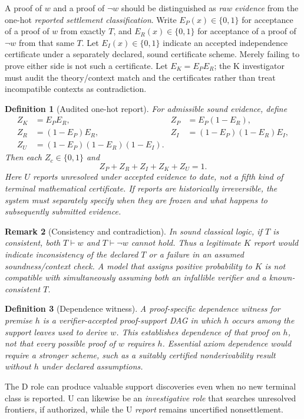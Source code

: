 \documentclass[11pt]{article}
\newtheorem{definition}{Definition}[section]
\newtheorem{remark}[definition]{Remark}
\begin{document}
A proof of $w$ and a proof of $\neg w$ should be distinguished as \emph{raw evidence} from the one-hot \emph{reported settlement classification}. Write $E_P(x)\in\{0,1\}$ for acceptance of a proof of $w$ from exactly $T$, and $E_R(x)\in\{0,1\}$ for acceptance of a proof of $\neg w$ from that same $T$. Let $E_I(x)\in\{0,1\}$ indicate an accepted independence certificate under a separately declared, sound certificate scheme. Merely failing to prove either side is not such a certificate. Let $E_K=E_PE_R$; the K investigator must audit the theory/context match and the certificates rather than treat incompatible contexts as contradiction.

\begin{definition}[Audited one-hot report]
For admissible sound evidence, define
\begin{align*}
Z_K&=E_PE_R,&Z_P&=E_P(1-E_R),\\
Z_R&=(1-E_P)E_R,&Z_I&=(1-E_P)(1-E_R)E_I,\\
Z_U&=(1-E_P)(1-E_R)(1-E_I).
\end{align*}
Then each $Z_c\in\{0,1\}$ and
\[
Z_P+Z_R+Z_I+Z_K+Z_U=1.
\]
Here $U$ reports \emph{unresolved under accepted evidence to date}, not a fifth kind of terminal mathematical certificate. If reports are historically irreversible, the system must separately specify when they are frozen and what happens to subsequently submitted evidence.
\end{definition}

\begin{remark}[Consistency and contradiction]
In sound classical logic, if $T$ is consistent, both $T\vdash w$ and $T\vdash\neg w$ cannot hold. Thus a legitimate $K$ report would indicate inconsistency of the \emph{declared} $T$ or a failure in an assumed soundness/context check. A model that assigns positive probability to $K$ is not compatible with simultaneously assuming both an infallible verifier and a known-consistent $T$.
\end{remark}

\begin{definition}[Dependence witness]
A \emph{proof-specific dependence witness} for premise $h$ is a verifier-accepted proof-support DAG in which $h$ occurs among the support leaves used to derive $w$. This establishes dependence of that proof on $h$, not that every possible proof of $w$ requires $h$. Essential axiom dependence would require a stronger scheme, such as a suitably certified nonderivability result without $h$ under declared assumptions.
\end{definition}
The D role can produce valuable support discoveries even when no new terminal class is reported. U can likewise be an \emph{investigative role} that searches unresolved frontiers, if authorized, while the U \emph{report} remains uncertified nonsettlement.
\end{document}

